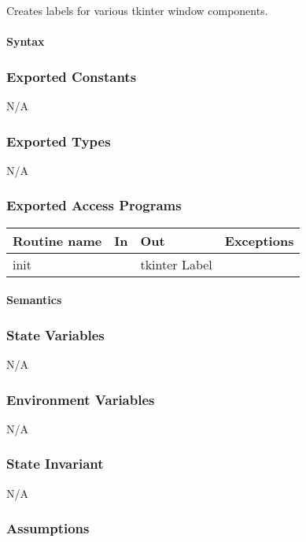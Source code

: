 \documentclass[12pt]{article}
\begin{document}
Creates labels for various tkinter window components.

\paragraph*{Syntax}

\subsubsection*{Exported Constants}
N/A
\subsubsection*{Exported Types}

N/A

\subsubsection* {Exported Access Programs}

\begin{tabular}{| l | l | l | l |}
\hline
\textbf{Routine name} & \textbf{In} & \textbf{Out} & \textbf{Exceptions}\\
\hline
init & & tkinter Label & \\
\hline
\end{tabular}

\paragraph* {Semantics}

\subsubsection*{State Variables}

N/A

\subsubsection*{Environment Variables}

N/A

\subsubsection*{State Invariant}

N/A

\subsubsection*{Assumptions}
\end{document}
